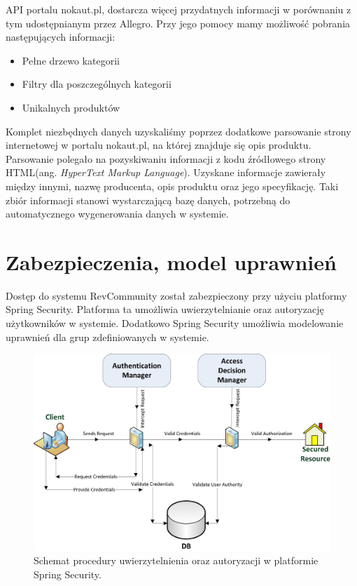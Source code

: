 API portalu nokaut.pl, dostarcza więcej przydatnych informacji w porównaniu z tym udostępnianym przez Allegro. Przy jego pomocy mamy możliwość pobrania następujących informacji:

\begin{itemize}
\item Pełne drzewo kategorii
\item Filtry dla poszczególnych kategorii
\item Unikalnych produktów
\end{itemize}

Komplet niezbędnych danych uzyskaliśmy poprzez dodatkowe parsowanie strony internetowej w portalu nokaut.pl, na której znajduje się opis produktu. Parsowanie polegało na pozyskiwaniu informacji z kodu źródłowego strony HTML(ang. \textit{HyperText Markup Language}). Uzyskane informacje zawierały między innymi, nazwę producenta, opis produktu oraz jego specyfikację. Taki zbiór informacji stanowi wystarczającą bazę danych, potrzebną do automatycznego wygenerowania danych w systemie.

\section{Zabezpieczenia, model uprawnień}

Dostęp do systemu RevCommunity został zabezpieczony przy użyciu platformy Spring Security. Platforma ta umożliwia uwierzytelnianie oraz autoryzację użytkowników w systemie. Dodatkowo Spring Security umożliwia modelowanie uprawnień dla grup zdefiniowanych w systemie.

\begin{figure}[h]
	\centering
	\includegraphics[scale=0.7]{images/spring_diagram.jpg}
	\caption{Schemat procedury uwierzytelnienia oraz autoryzacji w platformie Spring Security.}
\end{figure}

